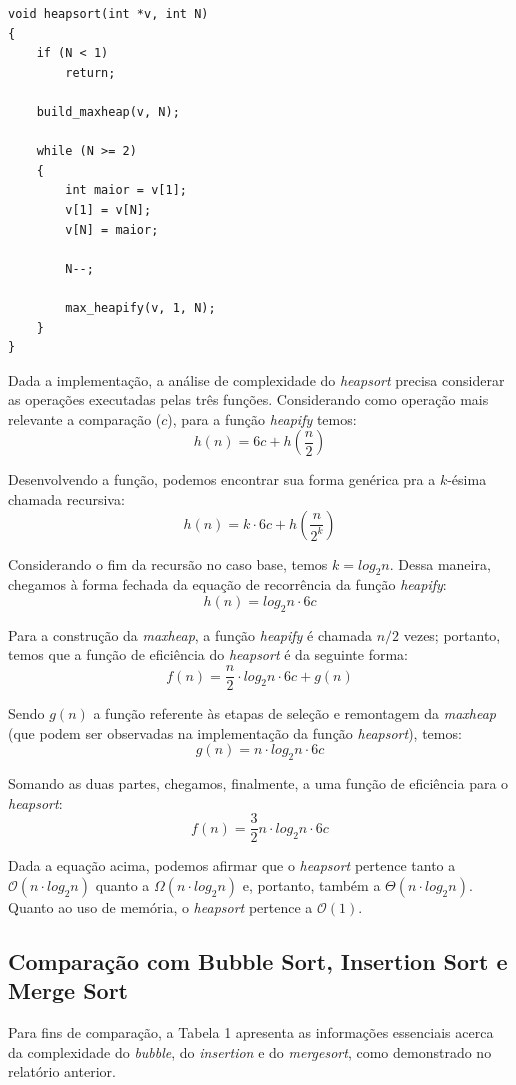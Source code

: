 \documentclass[fontsize=10pt]{article}
\begin{document}
\begin{lstlisting}
void heapsort(int *v, int N)
{
    if (N < 1)
        return;

    build_maxheap(v, N);

    while (N >= 2)
    {
        int maior = v[1];
        v[1] = v[N];
        v[N] = maior;

        N--;

        max_heapify(v, 1, N);
    }
}
\end{lstlisting}

\quad Dada a implementação, a análise de complexidade do \textit{heapsort} precisa considerar as operações executadas pelas três funções. Considerando como operação mais relevante a comparação ($c$), para a função \textit{heapify} temos:
\[h(n) = 6c + h(\frac{n}{2})\]

\quad Desenvolvendo a função, podemos encontrar sua forma genérica pra a $k$-ésima chamada recursiva:
\[h(n) = k\cdot6c + h(\frac{n}{2^k})\]

\quad Considerando o fim da recursão no caso base, temos $k = log_2n$. Dessa maneira, chegamos à forma fechada da equação de recorrência da função \textit{heapify}:
\[h(n) = log_2n\cdot6c\]

\quad Para a construção da \textit{maxheap}, a função \textit{heapify} é chamada $n/2$ vezes; portanto, temos que a função de eficiência do \textit{heapsort} é da seguinte forma:
\[f(n) = \frac{n}{2} \cdot log_2n \cdot 6c + g(n)\]

\quad Sendo $g(n)$ a função referente às etapas de seleção e remontagem da \textit{maxheap} (que podem ser observadas na implementação da função \textit{heapsort}), temos:
\[g(n) = n \cdot log_2n \cdot 6c\]

\quad Somando as duas partes, chegamos, finalmente, a uma função de eficiência para o \textit{heapsort}:
\[f(n) = \frac{3}{2}n \cdot log_2n \cdot 6c\]

\quad Dada a equação acima, podemos afirmar que o \textit{heapsort} pertence tanto a $\mathcal{O}(n \cdot log_2n)$ quanto a $\Omega(n \cdot log_2n)$ e, portanto, também a $\Theta(n \cdot log_2n)$. Quanto ao uso de memória, o \textit{heapsort} pertence a $\mathcal{O}(1)$.

\subsection{Comparação com Bubble Sort, Insertion Sort e Merge Sort}

\quad Para fins de comparação, a Tabela 1 apresenta as informações essenciais acerca da complexidade do \textit{bubble}, do \textit{insertion} e do \textit{mergesort}, como demonstrado no relatório anterior\cite{relatorio1}.
\end{document}
